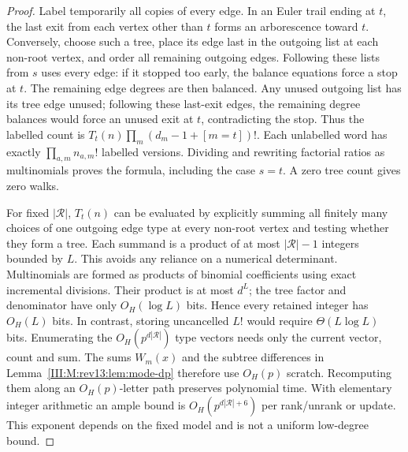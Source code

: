 \begin{proof}
Label temporarily all copies of every edge. In an Euler trail ending at $t$,
the last exit from each vertex other than $t$ forms an arborescence toward
$t$. Conversely, choose such a tree, place its edge last in the outgoing
list at each non-root vertex, and order all remaining outgoing edges.
Following these lists from $s$ uses every edge: if it stopped too early,
the balance equations force a stop at $t$. The remaining edge degrees
are then balanced. Any unused outgoing list has its tree edge unused;
following these last-exit edges, the remaining degree balances would force
an unused exit at $t$, contradicting the stop. Thus the labelled count is
$T_t(n)\prod_m(d_m-1+[m=t])!$.
Each unlabelled word has exactly $\prod_{a,m}n_{a,m}!$ labelled versions.
Dividing and rewriting factorial ratios as multinomials proves the formula,
including the case $s=t$. A zero tree count gives zero walks.

For fixed $|\mathcal R|$, $T_t(n)$ can be evaluated by explicitly summing
all finitely many choices of one outgoing edge type at every non-root
vertex and testing whether they form a tree. Each summand is a product of
at most $|\mathcal R|-1$ integers bounded by $L$. This avoids any reliance
on a numerical determinant. Multinomials are formed as products of
binomial coefficients using exact incremental divisions. Their product is
at most $d^L$; the tree factor and denominator have only $O_H(\log L)$
bits. Hence every retained integer has $O_H(L)$ bits. In contrast, storing
uncancelled $L!$ would require $\Theta(L\log L)$ bits.
Enumerating the $O_H(p^{d|\mathcal R|})$ type vectors needs only the
current vector, count and sum. The sums $W_m(x)$ and the subtree differences
in Lemma~\ref{III:M:rev13:lem:mode-dp} therefore use $O_H(p)$ scratch. Recomputing them
along an $O_H(p)$-letter path preserves polynomial time. With elementary
integer arithmetic an ample bound is $O_H(p^{d|\mathcal R|+6})$ per
rank/unrank or update. This exponent depends on the fixed model and is not
a uniform low-degree bound.
\end{proof}
